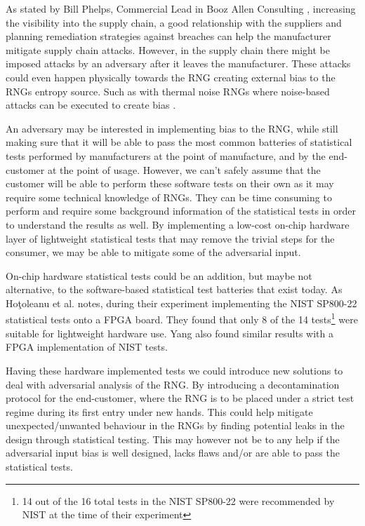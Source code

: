 \documentclass[]{final_report}
\begin{document}
\par{As stated by Bill Phelps, Commercial Lead in Booz Allen Consulting \cite{Phelps:2019}, increasing the visibility into the supply chain, a good relationship with the suppliers and planning remediation strategies against breaches can help the manufacturer mitigate supply chain attacks. However, in the supply chain there might be imposed attacks by an adversary after it leaves the manufacturer. These attacks could even happen physically towards the RNG creating external bias to the RNGs entropy source. Such as with thermal noise RNGs where noise-based attacks can be executed to create bias \cite{Brown:2020}.}

\par{An adversary may be interested in implementing bias to the RNG, while still making sure that it will be able to pass the most common batteries of statistical tests performed by manufacturers at the point of manufacture, and by the end-customer at the point of usage. However, we can’t safely assume that the customer will be able to perform these software tests on their own as it may require some technical knowledge of RNGs. They can be time consuming to perform and require some background information of the statistical tests in order to understand the results as well.  By implementing a low-cost on-chip hardware layer of lightweight statistical tests that may remove the trivial steps for the consumer, we may be able to mitigate some of the adversarial input.}

\par{On-chip hardware statistical tests could be an addition, but maybe not alternative, to the software-based statistical test batteries that exist today. As Hoţoleanu et al. \cite{Hotoleanu:2010} notes, during their experiment implementing the NIST SP800-22 statistical tests onto a FPGA board. They found that only 8 of the 14 tests\footnote{14 out of the 16 total tests in the NIST SP800-22 were recommended by NIST at the time of their experiment\cite{Hotoleanu:2010}} were suitable for lightweight hardware use. Yang\cite{Yang:2016} also found similar results with a FPGA implementation of NIST tests.}

\par{Having these hardware implemented tests we could introduce new solutions to deal with adversarial analysis of the RNG. By introducing a decontamination protocol for the end-customer, where the RNG is to be placed under a strict test regime during its first entry under new hands. This could help mitigate unexpected/unwanted behaviour in the RNGs by finding potential leaks in the design through statistical testing. This may however not be to any help if the adversarial input bias is well designed, lacks flaws and/or are able to pass the statistical tests.}
\end{document}
